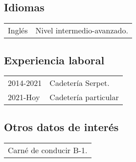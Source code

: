 \documentclass[12pt]{article}
\begin{document}
\subsection*{Idiomas}
\begin{tabular}{l l}
  Inglés&Nivel intermedio-avanzado.\\
\end{tabular}
\subsection*{Experiencia laboral}
\begin{tabular}{l l}
  2014-2021&Cadetería Serpet.\\
  2021-Hoy&Cadetería particular
\end{tabular}
\subsection*{Otros datos de interés}
\begin{tabular}{l}
  Carné de conducir B-1.\\
\end{tabular}
\end{document}
